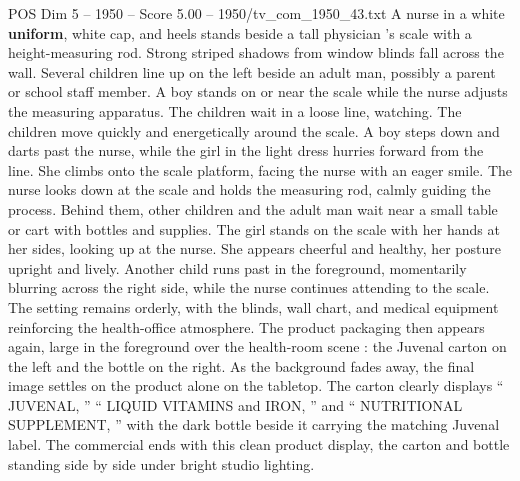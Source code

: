 \begin{textsample}{POS Dim 5 – 1950 – Score 5.00 – 1950/tv\_com\_1950\_43.txt}
A nurse in a white \textbf{uniform}, white cap, and heels stands beside a tall physician ’s scale with a height-measuring rod.
Strong striped shadows from window blinds fall across the wall.
Several children line up on the left beside an adult man, possibly a parent or school staff member.
A boy stands on or near the scale while the nurse adjusts the measuring apparatus.
The children wait in a loose line, watching.
The children move quickly and energetically around the scale.
A boy steps down and darts past the nurse, while the girl in the light dress hurries forward from the line.
She climbs onto the scale platform, facing the nurse with an eager smile.
The nurse looks down at the scale and holds the measuring rod, calmly guiding the process.
Behind them, other children and the adult man wait near a small table or cart with bottles and supplies.
The girl stands on the scale with her hands at her sides, looking up at the nurse.
She appears cheerful and healthy, her posture upright and lively.
Another child runs past in the foreground, momentarily blurring across the right side, while the nurse continues attending to the scale.
The setting remains orderly, with the blinds, wall chart, and medical equipment reinforcing the health-office atmosphere.
The product packaging then appears again, large in the foreground over the health-room scene : the Juvenal carton on the left and the bottle on the right.
As the background fades away, the final image settles on the product alone on the tabletop.
The carton clearly displays “ JUVENAL, ” “ LIQUID VITAMINS and IRON, ” and “ NUTRITIONAL SUPPLEMENT, ” with the dark bottle beside it carrying the matching Juvenal label.
The commercial ends with this clean product display, the carton and bottle standing side by side under bright studio lighting.

\end{textsample}
